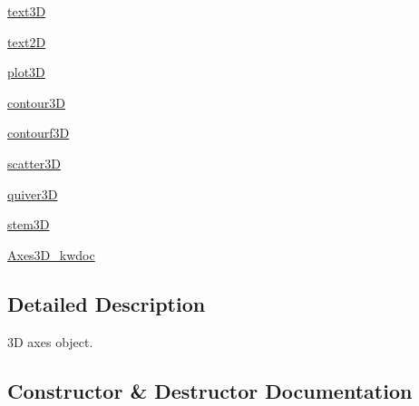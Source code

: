 \begin{DoxyCompactItemize}
\hyperlink{classmplot3d_1_1axes3d_1_1Axes3D_a6833160729b0db84d47b239d4e11d6e7}{text3D}
\item 
\hyperlink{classmplot3d_1_1axes3d_1_1Axes3D_ae21a86493ed197f105477714ea0c03e2}{text2D}
\item 
\hyperlink{classmplot3d_1_1axes3d_1_1Axes3D_af2fcc217077255eb4094aaa0a8d37f34}{plot3D}
\item 
\hyperlink{classmplot3d_1_1axes3d_1_1Axes3D_a2cf30ce304a4ee1ccfebcdc1c2199e9c}{contour3D}
\item 
\hyperlink{classmplot3d_1_1axes3d_1_1Axes3D_a9b9a540d2d1c7a7d45ea81705b4e2810}{contourf3D}
\item 
\hyperlink{classmplot3d_1_1axes3d_1_1Axes3D_aaadaede69113ff85ad8662eeffa3d551}{scatter3D}
\item 
\hyperlink{classmplot3d_1_1axes3d_1_1Axes3D_a27f6d4c35096eb6e54c103a58f1d7b0f}{quiver3D}
\item 
\hyperlink{classmplot3d_1_1axes3d_1_1Axes3D_a9b2dfc6ca58837e31090970da815cdaa}{stem3D}
\item 
\hyperlink{classmplot3d_1_1axes3d_1_1Axes3D_a15b234d65ba71af9a539f914b5a0ee87}{Axes3\+D\+\_\+kwdoc}
\end{DoxyCompactItemize}


\subsection{Detailed Description}
\begin{DoxyVerb}3D axes object.
\end{DoxyVerb}
 

\subsection{Constructor \& Destructor Documentation}
\mbox{\label{classmplot3d_1_1axes3d_1_1Axes3D_a2bbe5a51eea0ab294188e8aa8005fa2e}} 
